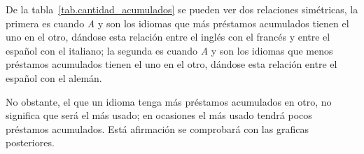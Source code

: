 
De la tabla~\ref{tab.cantidad_acumulados} se pueden ver dos relaciones simétricas, la primera es cuando \textit{A} y  son los idiomas que más préstamos acumulados tienen el uno en el otro, dándose esta relación entre el inglés con el francés y entre el español con el italiano;  la segunda es cuando \textit{A} y  son los idiomas que menos préstamos acumulados tienen el uno en el otro, dándose esta relación  entre el español con el alemán.  




No obstante, el que un idioma tenga más préstamos acumulados en otro, no significa que será el más usado;  en ocasiones el más usado tendrá pocos préstamos acumulados.  Está afirmación se comprobará con las graficas posteriores. 







